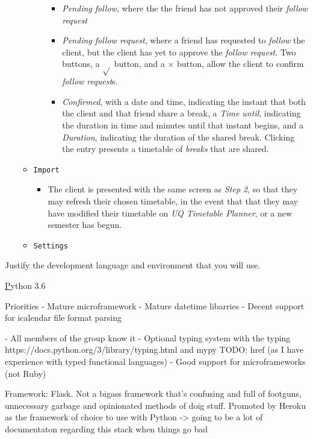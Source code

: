 \documentclass[11pt,a4paper]{report}
\begin{document}
\begin{itemize}
\begin{itemize}
\begin{itemize}
\begin{itemize}
                            \item \textit{Pending follow}, where the the friend has not approved their \textit{follow request}
                            \item \textit{Pending follow request}, where a friend has requested to \textit{follow} the client, but the client has yet to approve the \textit{follow request}. Two buttons, a $\sqrt{}$ button, and a $\times$ button, allow the client to confirm \textit{follow request}s.
                            \item \textit{Confirmed}, with a date and time, indicating the instant that both the client and that friend share a break, a \textit{Time until}, indicating the duration in time and minutes until that instant begins, and a \textit{Duration}, indicating the duration of the shared break. Clicking the entry presents a timetable of \textit{breaks} that are shared.
                        \end{itemize}
                \end{itemize}
            \item \texttt{Import}
                \begin{itemize}
                    \item The client is presented with the same screen as \textit{Step 2}, so that they may refresh their chosen timetable, in the event that that they may have modified their timetable on \textit{UQ Timetable Planner}, or a new semester has begun.
                \end{itemize}
            \item \texttt{Settings}
        \end{itemize}
\end{itemize}


Justify the development language and environment that you will use.

\href{https://www.python.org/}Python 3.6


Priorities
- Mature microframework
- Mature datetime libarries
- Decent support for icalendar file format parsing


- All members of the group know it
- Optional typing system with the typing https://docs.python.org/3/library/typing.html and mypy TODO: href (as I have experience with typed functional languages)
- Good support for microframeworks (not Ruby)

Framework: Flask. Not a bigass framework that's confusing and full of footguns, unnecessary garbage and opinionated methods of doig stuff.
Promoted by Heroku as the framework of choice to use with Python -> going to be a lot of documentaton regarding this stack when things go bad
\end{document}

